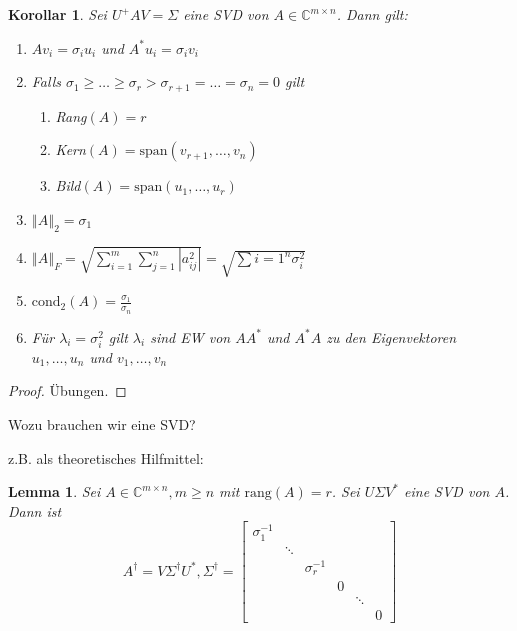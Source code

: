 \documentclass{book}
\newtheorem{corollary}[algorithm]{Korollar}
\newtheorem{lemma}[algorithm]{Lemma}
\def\C{\mathbb{C}}
\def\rang{\text{rang}}
\def\cond{\text{cond}}
\begin{document}
            \begin{corollary}\label{k4.22}
                Sei $U^+ A V= \Sigma$ eine SVD von $A\in\C^{m\times n}$. Dann gilt:
                \begin{enumerate}
                    \item $Av_i=\sigma_iu_i$ und  $A^*u_i = \sigma_i v_i$
                    \item Falls $\sigma_1\geq \dots \geq \sigma_r >\sigma_{r+1}=\dots = \sigma_n=0$ gilt
                        \begin{enumerate}
                            \item Rang$(A)=r$
                            \item Kern$(A)=\text{span}(v_{r+1},\dots, v_n)$
                            \item Bild$(A)=\text{span}(u_1,\dots,u_r)$
                        \end{enumerate}
                    \item $\left\Vert A \right\Vert_2 = \sigma_1$
                    \item $\left\Vert A \right\Vert_F=\sqrt{\sum_{i=1}^m\sum_{j=1}^n\left\vert a_{ij}^2 \right\vert} = \sqrt{\sum{i=1}^n\sigma_i^2}$
                    \item $\cond_2(A)=\frac{\sigma_1}{\sigma_n}$
                    \item Für $\lambda_i=\sigma_i^2$ gilt $\lambda_i$ sind EW von $AA^*$ und $A^*A$ zu den Eigenvektoren $u_1,\dots, u_n$ und $v_1,\dots, v_n$
                \end{enumerate}
            \end{corollary}

            \begin{proof}
                Übungen.
            \end{proof}

            Wozu brauchen wir eine SVD?

            z.B. als theoretisches Hilfmittel:
            \begin{lemma}\label{l4.23}
                Sei $A\in \C^{m\times n},m\geq n$ mit $\rang(A)=r$. Sei $U\Sigma V^*$ eine SVD von $A$.
                Dann ist 
                \begin{equation*}
                    A^\dagger = V \Sigma^\dagger U ^*, \Sigma^\dagger=\begin{bmatrix}
                        \sigma_1^{-1} & & &&\\
                        & \ddots & & &&\\
                        &&\sigma_r^{-1} & &&\\
                        &&&0&&\\
                        &&&&\ddots&\\
                        &&&&&0
                    \end{bmatrix}
                \end{equation*}
            \end{lemma}
\end{document}

